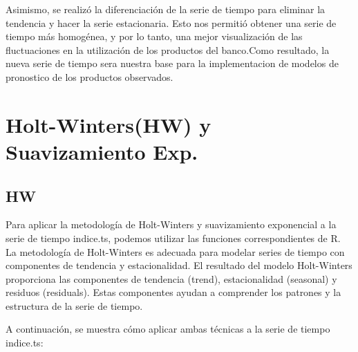 \documentclass[
]{book}
\newenvironment{Shaded}{\begin{snugshade}}{\end{snugshade}}
\newcommand{\CommentTok}[1]{\textcolor[rgb]{0.56,0.35,0.01}{\textit{#1}}}
\newcommand{\FunctionTok}[1]{\textcolor[rgb]{0.00,0.00,0.00}{#1}}
\newcommand{\NormalTok}[1]{#1}
\newcommand{\OtherTok}[1]{\textcolor[rgb]{0.56,0.35,0.01}{#1}}
\newcommand{\SpecialCharTok}[1]{\textcolor[rgb]{0.00,0.00,0.00}{#1}}
\newcommand{\StringTok}[1]{\textcolor[rgb]{0.31,0.60,0.02}{#1}}
\begin{document}
Asimismo, se realizó la diferenciación de la serie de tiempo para eliminar la tendencia y hacer la serie estacionaria. Esto nos permitió obtener una serie de tiempo más homogénea, y por lo tanto, una mejor visualización de las fluctuaciones en la utilización de los productos del banco.Como resultado, la nueva serie de tiempo sera nuestra base para la implementacion de modelos de pronostico de los productos observados.

\hypertarget{holt-wintershw-y-suavizamiento-exp.}{%
\chapter{Holt-Winters(HW) y Suavizamiento Exp.}\label{holt-wintershw-y-suavizamiento-exp.}}

\hypertarget{hw}{%
\section{HW}\label{hw}}

Para aplicar la metodología de Holt-Winters y suavizamiento exponencial a la serie de tiempo indice.ts, podemos utilizar las funciones correspondientes de R. La metodología de Holt-Winters es adecuada para modelar series de tiempo con componentes de tendencia y estacionalidad.
El resultado del modelo Holt-Winters proporciona las componentes de tendencia (trend), estacionalidad (seasonal) y residuos (residuals). Estas componentes ayudan a comprender los patrones y la estructura de la serie de tiempo.

A continuación, se muestra cómo aplicar ambas técnicas a la serie de tiempo indice.ts:

\begin{Shaded}
\end{Shaded}
\end{document}
